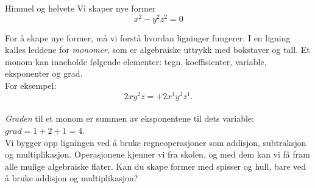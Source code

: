 \begin{surferPage}{Himmel og helvete}
Vi skaper nye former \\
\smallskip
\[x^2	- y^2z^2	= 0\]

\singlespacing
For å skape nye former, må vi forstå hvordan ligninger fungerer. I en ligning kalles leddene for {\it monomer}, som er algebraiske uttrykk med bokstaver og tall.
\singlespacing
Et monom kan inneholde følgende elementer: 
tegn, koeffisienter, variable, eksponenter og grad.\\
\singlespacing
For eksempel: 
\smallskip
\[2xy^2z = +2x^1y^2z^1.\]
\\
\smallskip
{\it Graden} til et monom er summen av eksponentene til dets variable: $grad  = 1 + 2 + 1 = 4$.  \\
\singlespacing
Vi bygger opp ligningen ved å bruke regneoperasjoner som addisjon, subtraksjon og multiplikasjon. Operasjonene kjenner vi fra skolen, og med dem kan vi få fram alle mulige algebraiske flater.
\singlespacing
Kan du skape former med spisser og hull, bare ved å bruke addisjon og multiplikasjon?
\end{surferPage}
